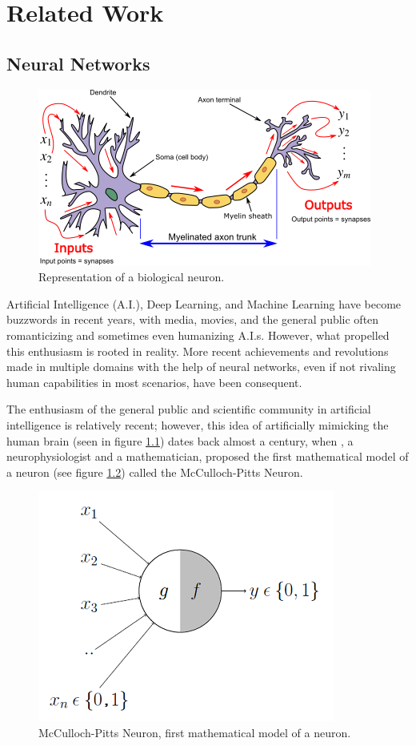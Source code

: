 \chapter{Related Work}
\label{RelatedWork}

\section{Neural Networks}
\label{neural_networks}

\begin{figure}[ht]
    \includegraphics[clip,width=1\columnwidth]{Figures/related/biological_neuron.png}
    \caption{ Representation of a biological neuron. }
    \label{fig:biological_neuron}
\end{figure}

Artificial Intelligence (A.I.), Deep Learning, and Machine Learning have become
buzzwords in recent years, with media, movies, and the general public often
romanticizing and sometimes even humanizing A.I.s. However, what propelled this
enthusiasm is rooted in reality. More recent achievements and revolutions made
in multiple domains with the help of neural networks, even if not rivaling human
capabilities in most scenarios, have been consequent.

The enthusiasm of the general public and scientific community in artificial
intelligence is relatively recent; however, this idea of artificially mimicking
the human brain (seen in figure \ref{fig:biological_neuron}) dates back almost a
century, when \cite{warren_s_mcculloch_walter_pitts_logical_1943}, a
neurophysiologist and a mathematician, proposed the first mathematical model of
a neuron (see figure \ref{fig:mccullock_neuron}) called the McCulloch-Pitts
Neuron.
\begin{figure}[ht]
    \centering
    \includegraphics[clip,width=.5\columnwidth]{Figures/related/cullock-neuron.png}
    \caption{ McCulloch-Pitts Neuron, first mathematical model of a neuron. }
    \label{fig:mccullock_neuron}
\end{figure}

